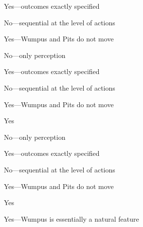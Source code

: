 \documentclass{article}
\begin{document}
\begin{huge}
 Yes---outcomes exactly specified

 No---sequential at the level of actions

  Yes---Wumpus and Pits do not move



 No---only  perception

 Yes---outcomes exactly specified

 No---sequential at the level of actions

  Yes---Wumpus and Pits do not move

 Yes



 No---only  perception

 Yes---outcomes exactly specified

 No---sequential at the level of actions

  Yes---Wumpus and Pits do not move

 Yes

 Yes---Wumpus is essentially a natural feature





\vspace*{0.4in}

\textwidth
{}


\vspace*{0.4in}

\textwidth
{}


\vspace*{0.4in}


\end{huge}
\end{document}
